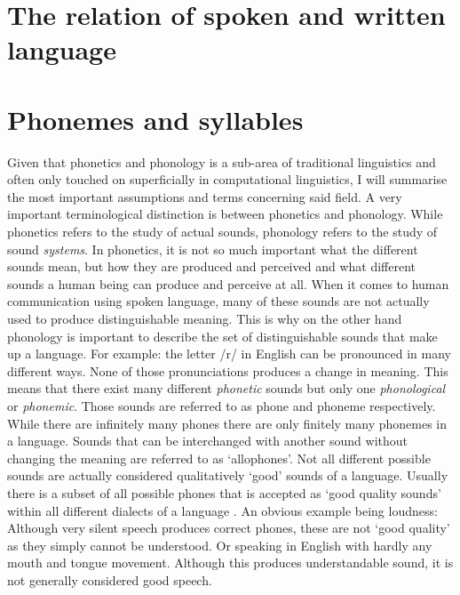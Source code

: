 \label{chap:ling-background}

\section{The relation of spoken and written language}

\section{Phonemes and syllables}
\label{phonology}
Given that phonetics and phonology is a sub-area of traditional linguistics and often only touched on superficially in computational linguistics, I will summarise the most important assumptions and terms concerning said field. A very important terminological distinction is between phonetics and phonology. While phonetics refers to the study of actual sounds, phonology refers to the study of sound \textit{systems}. In phonetics, it is not so much important what the different sounds mean, but how they are produced and perceived and what different sounds a human being can produce and perceive at all. When it comes to human communication using spoken language, many of these sounds are not actually used to produce distinguishable meaning. This is why on the other hand phonology is important to describe the set of distinguishable sounds that make up a language. For example: the letter /r/ in English can be pronounced in many different ways. None of those pronunciations produces a change in meaning. This means that there exist many different \textit{phonetic} sounds but only one \textit{phonological} or \textit{phonemic}. Those sounds are referred to as phone and phoneme respectively. While there are infinitely many phones there are only finitely many phonemes in a language. Sounds that can be interchanged with another sound without changing the meaning are referred to as `allophones'. Not all different possible sounds are actually considered qualitatively `good' sounds of a language. Usually there is a subset of all possible phones that is accepted as `good quality sounds' within all different dialects of a language \citep{Intro.2007}. An obvious example being loudness: Although very silent speech produces correct phones, these are not `good quality' as they simply cannot be understood. Or speaking in English with hardly any mouth and tongue movement. Although this produces understandable sound, it is not generally considered good speech. 

